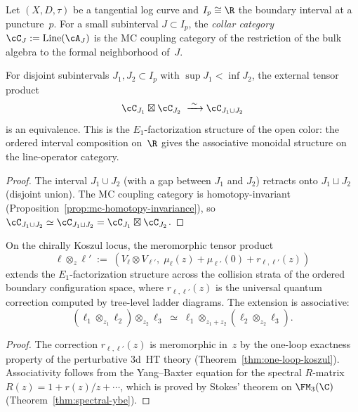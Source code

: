 \begin{construction}
\label{constr:local-collar-categories}
Let $(X, D, \tau)$ be a tangential log curve and
$I_p \cong \R$ the boundary interval at a puncture~$p$.
For a small subinterval $J \subset I_p$, the \emph{collar category}
$\cC_J := \operatorname{Line}(\cA_J)$
is the MC coupling category of the restriction of the bulk algebra
to the formal neighborhood of~$J$.
\end{construction}

\begin{theorem}
\label{thm:e1-factorization-disjoint}
For disjoint subintervals $J_1, J_2 \subset I_p$ with
$\sup J_1 < \inf J_2$, the external tensor product
\[
 \cC_{J_1} \boxtimes \cC_{J_2}
 \;\xrightarrow{\;\sim\;}
 \cC_{J_1 \cup J_2}
\]
is an equivalence. This is the $E_1$-factorization structure of
the open color: the ordered interval composition on~$\R$ gives
the associative monoidal structure on the line-operator category.
\end{theorem}

\begin{proof}
The interval $J_1 \cup J_2$ (with a gap between $J_1$ and $J_2$)
retracts onto $J_1 \sqcup J_2$ (disjoint union). The MC
coupling category is homotopy-invariant
(Proposition~\ref{prop:mc-homotopy-invariance}), so
$\cC_{J_1 \cup J_2} \simeq \cC_{J_1 \sqcup J_2}
= \cC_{J_1} \boxtimes \cC_{J_2}$.
\end{proof}

\begin{theorem}
\label{thm:collision-extension}
On the chirally Koszul locus, the meromorphic tensor product
\[
 \ell \otimes_z \ell'
 \;:=\;
 (V_\ell \otimes V_{\ell'},\;
 \mu_\ell(z) + \mu_{\ell'}(0) + r_{\ell,\ell'}(z))
\]
extends the $E_1$-factorization structure across the collision
strata of the ordered boundary configuration space, where
$r_{\ell,\ell'}(z)$ is the universal quantum correction computed
by tree-level ladder diagrams. The extension is associative:
\[
 (\ell_1 \otimes_{z_1} \ell_2) \otimes_{z_2} \ell_3
 \;\simeq\;
 \ell_1 \otimes_{z_1 + z_2} (\ell_2 \otimes_{z_2} \ell_3).
\]
\end{theorem}

\begin{proof}
The correction $r_{\ell,\ell'}(z)$ is meromorphic in~$z$ by the
one-loop exactness property of the perturbative 3d~HT theory
(Theorem~\ref{thm:one-loop-koszul}). Associativity follows from
the Yang--Baxter equation for the spectral $R$-matrix
$R(z) = 1 + r(z)/z + \cdots$, which is proved by Stokes' theorem
on $\FM_3(\C)$
(Theorem~\ref{thm:spectral-ybe}).
\end{proof}

